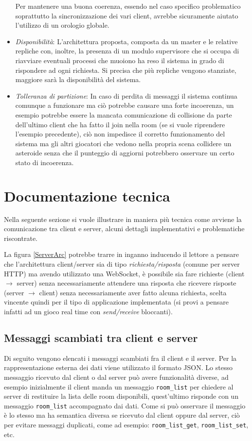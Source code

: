 \documentclass[paper=a4, fontsize=11pt]{scrartcl} %
\numberwithin{equation}{section} %
\numberwithin{figure}{section} %
\numberwithin{table}{section} %
\begin{document}
\begin{itemize}
Per mantenere una buona coerenza, essendo nel caso specifico problematico soprattutto la sincronizzazione dei vari client, avrebbe sicuramente aiutato l'utilizzo di un orologio globale.
\item \textit{Disponibilità}: L'architettura proposta, composta da un master e le relative repliche con, inoltre, la presenza di un modulo supervisore che si occupa di riavviare eventuali processi che muoiono ha reso il sistema in grado di rispondere ad ogni richiesta. Si precisa che più repliche vengono stanziate, maggiore sarà la disponibilità del sistema.
\item \textit{Tolleranza di partizione}: In caso di perdita di messaggi il sistema continua comunque a funzionare ma ciò potrebbe causare una forte incoerenza, un esempio potrebbe essere la mancata comunicazione di collisione da parte dell'ultimo client che ha fatto il join nella room (se si vuole riprendere l'esempio precedente), ciò non impedisce il corretto funzionamento del sistema ma gli altri giocatori che vedono nella propria scena collidere un asteroide senza che il punteggio di aggiorni potrebbero osservare un certo stato di incoerenza.
\end{itemize}

\section{Documentazione tecnica}
\label{DocumentazioneTecnica}
Nella seguente sezione si vuole illustrare in maniera più tecnica come avviene la comunicazione tra client e server, alcuni dettagli implementativi e problematiche riscontrate.

La figura \ref{ServerArc} potrebbe trarre in inganno inducendo il lettore a pensare che l'architettura client/server sia di tipo \textit{richiesta/risposta} (comune per server HTTP) ma avendo utilizzato una WebSocket, è possibile sia fare richieste (client $\rightarrow$ server) senza necessariamente attendere una risposta che ricevere risposte (server $\rightarrow$ client) senza necessariamente aver fatto alcuna richiesta, scelta vincente quindi per il tipo di applicazione implementata (si provi a pensare infatti ad un gioco real time con \textit{send/receive} bloccanti).

\subsection{Messaggi scambiati tra client e server}

Di seguito vengono elencati i messaggi scambiati fra il client e il server. Per la rappresentazione esterna dei dati viene utilizzato il formato JSON. Lo stesso messaggio ricevuto dal client o dal server può avere funzionalità diverse, ad esempio inizialmente il client manda un messaggio \texttt{room\_list} per chiedere al server di restituire la lista delle room disponibili, quest'ultimo risponde con un messaggio \texttt{room\_list} accompagnato dai dati. Come si può osservare il messaggio è lo stesso ma ha semantica diversa se ricevuto dal client oppure dal server, ciò per evitare messaggi duplicati, come ad esempio: \texttt{room\_list\_get}, \texttt{room\_list\_set}, etc.
\end{document}
